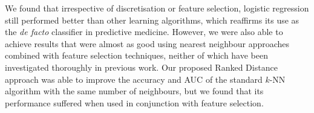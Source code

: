 We found that irrespective of discretisation or feature selection, logistic
regression still performed better than other learning algorithms, which
reaffirms its use as the \textit{de facto} classifier in predictive medicine.
However, we were also able to achieve results that were almost as good using
nearest neighbour approaches combined with feature selection techniques,
neither of which have been investigated thoroughly in previous work. Our
proposed Ranked Distance approach was able to improve the accuracy and AUC of
the standard $k$-NN algorithm with the same number of neighbours, but we found
that its performance suffered when used in conjunction with feature selection.


